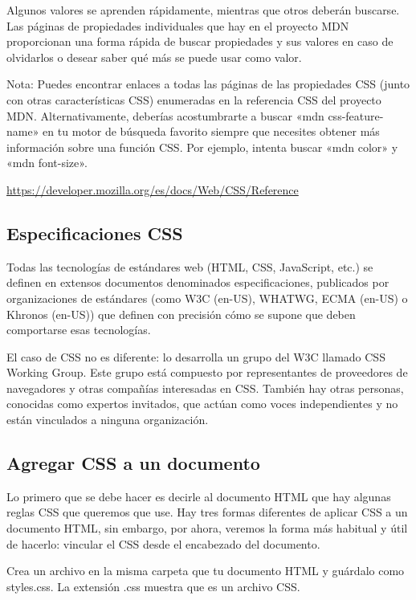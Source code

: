 \begin{enumerate}
Algunos valores se aprenden rápidamente, mientras que otros deberán buscarse. Las páginas de propiedades individuales que hay en el proyecto MDN proporcionan una forma rápida de buscar propiedades y sus valores en caso de olvidarlos o desear saber qué más se puede usar como valor.

\begin{remark}
Nota: Puedes encontrar enlaces a todas las páginas de las propiedades CSS (junto con otras características CSS) enumeradas en la referencia CSS del proyecto MDN. Alternativamente, deberías acostumbrarte a buscar «mdn css-feature-name» en tu motor de búsqueda favorito siempre que necesites obtener más información sobre una función CSS. Por ejemplo, intenta buscar «mdn color» y «mdn font-size».
\end{remark}

\url{https://developer.mozilla.org/es/docs/Web/CSS/Reference}

\subsection{Especificaciones CSS}

Todas las tecnologías de estándares web (HTML, CSS, JavaScript, etc.) se definen en extensos documentos denominados especificaciones, publicados por organizaciones de estándares (como W3C (en-US), WHATWG, ECMA (en-US) o Khronos (en-US)) que definen con precisión cómo se supone que deben comportarse esas tecnologías.

El caso de CSS no es diferente: lo desarrolla un grupo del W3C llamado CSS Working Group. Este grupo está compuesto por representantes de proveedores de navegadores y otras compañías interesadas en CSS. También hay otras personas, conocidas como expertos invitados, que actúan como voces independientes y no están vinculados a ninguna organización.

\subsection{Agregar CSS a un documento}

Lo primero que se debe hacer es decirle al documento HTML que hay algunas reglas CSS que queremos que use. Hay tres formas diferentes de aplicar CSS a un documento HTML, sin embargo, por ahora, veremos la forma más habitual y útil de hacerlo: vincular el CSS desde el encabezado del documento.

Crea un archivo en la misma carpeta que tu documento HTML y guárdalo como styles.css. La extensión .css muestra que es un archivo CSS.


\end{enumerate}
